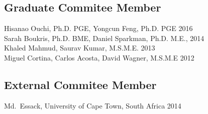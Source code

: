 \subsection*{Graduate Commitee Member}
Hisanao Ouchi, Ph.D. PGE, Yongcun Feng, Ph.D. PGE 2016 \\
Sarah Boukris, Ph.D. BME, Daniel Sparkman, Ph.D. M.E., 2014 \\
Khaled Mahmud, Saurav Kumar, M.S.M.E. 2013 \\
Miguel Cortina, Carlos Acosta, David Wagner, M.S.M.E 2012 

\subsection*{External Commitee Member}
Md.~Essack, University of Cape Town, South Africa 2014
